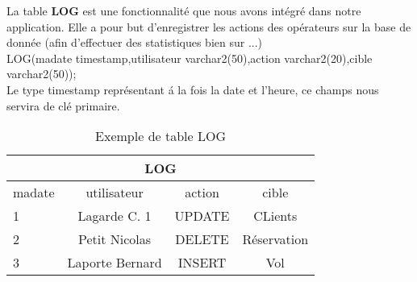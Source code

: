 \begin{table}[h]
 La table \textbf{LOG} est une fonctionnalit\'e que nous avons int\'egr\'e dans notre application. Elle a pour but d'enregistrer les actions des op\'erateurs sur la base de donn\'ee (afin d'effectuer des statistiques bien sur ...)\\
LOG(madate timestamp,utilisateur varchar2(50),action varchar2(20),cible varchar2(50));\\
Le type timestamp repr\'esentant \'a la fois la date et l'heure, ce champs nous servira de cl\'e primaire.
\begin{center}
\begin{tabular}{|l|c|c|c|}
\hline
\multicolumn{4}{|c|}{LOG}\\
\hline
madate&utilisateur&action&cible\\
\hline
1 &Lagarde C. 1&UPDATE&CLients\\
\hline
2 &Petit Nicolas&DELETE&R\'eservation\\
\hline
3 &Laporte Bernard&INSERT&Vol\\
\hline
\end{tabular}
\end{center}
\caption{Exemple de table LOG}
\end{table}
\newpage

